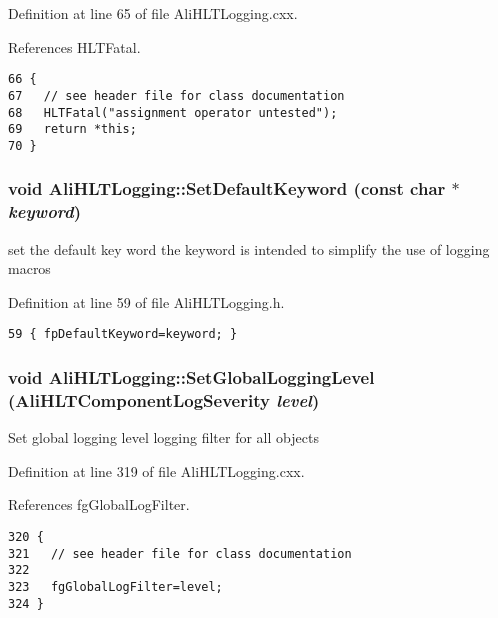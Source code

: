 Definition at line 65 of file Ali\-HLTLogging.cxx.

References HLTFatal.

\footnotesize\begin{verbatim}66 { 
67   // see header file for class documentation
68   HLTFatal("assignment operator untested");
69   return *this;
70 }
\end{verbatim}\normalsize 


\subsubsection{\setlength{\rightskip}{0pt plus 5cm}void Ali\-HLTLogging::Set\-Default\-Keyword (const char $\ast$ {\em keyword})\hspace{0.3cm}{\tt  [inline]}}\label{classAliHLTLogging_a4}


set the default key word the keyword is intended to simplify the use of logging macros 

Definition at line 59 of file Ali\-HLTLogging.h.

\footnotesize\begin{verbatim}59 { fpDefaultKeyword=keyword; }
\end{verbatim}\normalsize 


\subsubsection{\setlength{\rightskip}{0pt plus 5cm}void Ali\-HLTLogging::Set\-Global\-Logging\-Level ({\bf Ali\-HLTComponent\-Log\-Severity} {\em level})\hspace{0.3cm}{\tt  [static]}}\label{classAliHLTLogging_e2}


Set global logging level logging filter for all objects 

Definition at line 319 of file Ali\-HLTLogging.cxx.

References fg\-Global\-Log\-Filter.

\footnotesize\begin{verbatim}320 {
321   // see header file for class documentation
322 
323   fgGlobalLogFilter=level;
324 }
\end{verbatim}\normalsize 


